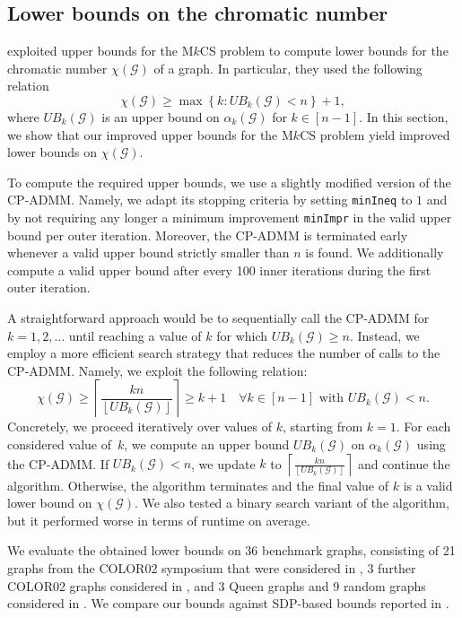 \documentclass[11pt, a4paper]{article}
\newcommand{\mc}{\mathcal}
\newcommand{\ceil}[1]{\left\lceil #1 \right\rceil}
\newcommand{\floor}[1]{\left\lfloor #1 \right\rfloor}
\begin{document}
\subsection{Lower bounds on the chromatic number} \label{Sec: Chromatic number}
\citet{Kuryatnikova2022MkCSProblem} exploited upper bounds for the M$k$CS problem to compute lower bounds for the chromatic number $\chi(\mc{G})$ of a graph. 
In particular, they used the following relation
\begin{equation}
    \chi(\mc{G}) \geq \max \left \{ k: UB_k(\mc{G}) < n \right \} + 1,
\end{equation}
where $UB_k(\mc{G})$ is an upper bound on $\alpha_k(\mc{G})$ for $k \in [n-1]$.
In this section, we show that our improved upper bounds for the M$k$CS problem yield improved lower bounds on $\chi(\mc{G})$.

To compute the required upper bounds, we use a slightly modified version of the CP-ADMM.
Namely, we adapt its stopping criteria by setting \texttt{minIneq} to $1$ and by not requiring any longer a minimum improvement \texttt{minImpr} in the valid upper bound per outer iteration.
Moreover, the CP-ADMM is terminated early whenever a valid upper bound strictly smaller than $n$ is found. 
We additionally compute a valid upper bound after every 100 inner iterations during the first outer iteration.

A straightforward approach would be to sequentially call the CP-ADMM for $k=1, 2, \hdots$ until reaching a value of $k$ for which $UB_k(\mc{G}) \geq n$. 
Instead, we employ a more efficient search strategy that reduces the number of calls to the CP-ADMM. Namely, we exploit the following relation:
\begin{equation}
    \chi(\mc{G}) \geq \ceil{\frac{kn}{\floor{UB_k(\mc{G})}}} \geq k + 1 \quad\forall k \in [n-1] \text{ with } UB_k(\mc{G}) < n.
\end{equation}
Concretely, we proceed iteratively over values of $k$, starting from $k=1$. 
For each considered value of~$k$, we compute an upper bound $UB_k(\mc{G})$ on $\alpha_k(\mc{G})$ using the CP-ADMM. If $UB_k(\mc{G}) < n$, we update $k$ to $\ceil{\frac{kn}{\floor{ UB_k(\mc{G})}}}$ and continue the algorithm. 
Otherwise, the algorithm terminates and the final value of $k$ is a valid lower bound on $\chi(\mc{G})$.
We also tested a binary search variant of the algorithm, but it performed worse in terms of runtime on average. 

We evaluate the obtained lower bounds on 36 benchmark graphs, consisting of 21 graphs from the COLOR02 symposium \citep{Johnson2002COLOR02} that were considered in \cite{Dukanovic2007SDPGraphColoring}, 3 further COLOR02 graphs considered in \cite{Gaar2020SDPGraphColoring}, and 3 Queen graphs and 9 random graphs considered in \cite{Pucher2025PracticalExperience}. 
We compare our bounds against SDP-based bounds reported in \cite{Dukanovic2007SDPGraphColoring, Gaar2020SDPGraphColoring, Kuryatnikova2022MkCSProblem, Pucher2025PracticalExperience}.
\end{document}
